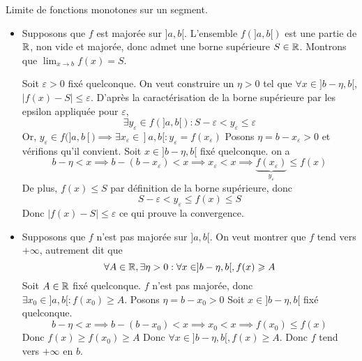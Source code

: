 \documentclass{article}
\renewenvironment{question_kholle}[2][ ]
{
	\subsection{\texorpdfstring{#2}{}}
	\notblank{#1}
	{
		\noindent #1
		\bigbreak
	}
	{}
	\begin{proof}
}
{
	\end{proof}
}
\begin{document}
{Limite de fonctions monotones sur un segment.}
  \begin{itemize}[label=$\star$]
    \item Supposons que $f$ est majorée sur $]a, b[$. L'ensemble $f(]a, b[)$ est une partie de $\mathbb R$, non vide et majorée, donc admet une borne supérieure $S \in \mathbb R$.
    Montrons que $\lim_{ x \to b }f(x) = S$.
    
    Soit $\varepsilon>0$ fixé quelconque. On veut construire un $\eta>0$ tel que $\forall x \in ]b-\eta, b[$, $\lvert f(x) - S \rvert \leqslant \varepsilon$.
    D'après la caractérisation de la borne supérieure par les epsilon appliquée pour $\varepsilon$, $$\exists y_{\varepsilon} \in f(]a, b[) : S - \varepsilon < y_{\varepsilon} \leqslant \varepsilon$$
    Or, $y_{\varepsilon} \in f(]a, b[) \implies \exists x_{\varepsilon}\in ]a, b[ : y_{\varepsilon} = f(x_{\varepsilon})$
    Posons $\eta = b - x_{\varepsilon} > 0$ et vérifions qu'il convient.
    Soit $x \in ]b - \eta, b[$ fixé quelconque.
    on a $$
    b-\eta < x \implies b- (b - x_{\varepsilon})< x \implies x_{\varepsilon} < x \implies \underbrace{ f(x_{\varepsilon}) }_{ y_{\varepsilon} } \leqslant f(x)
    $$
    De plus, $f(x) \leqslant S$ par définition de la borne supérieure, donc
    $$
    S - \varepsilon < y_{\varepsilon} \leqslant f(x) \leqslant S
    $$
    Donc $\lvert f(x) - S \rvert \leqslant \varepsilon$ ce qui prouve la convergence.

    \item Supposons que $f$ n'est pas majorée sur $]a, b[$.
    On veut montrer que $f$ tend vers $+\infty$, autrement dit que
    $$
    \forall A \in \mathbb R, \exists \eta >0 : \forall x \in ]b- \eta , b[, f(x)\geqslant A
    $$
    Soit $A \in \mathbb R$ fixé quelconque.
    $f$ n'est pas majorée, donc $\exists x_{0} \in ]a, b[ : f(x_{0}) \geqslant A$.
    Posons $\eta = b - x_{0} > 0$
    Soit $x \in ]b-\eta, b[$ fixé quelconque.
    $$
    b-\eta< x \implies b-(b-x_{0})< x \implies x_{0}<x \implies f(x_{0}) \leqslant f(x)
    $$
    Donc $f(x) \geqslant f(x_{0})\geqslant A$
    Donc $\forall x \in ]b-\eta, b[, f(x) \geqslant A$.
    Donc $f$ tend vers $+\infty$ en $b$.
  \end{itemize}
\end{question_kholle}
\end{document}
